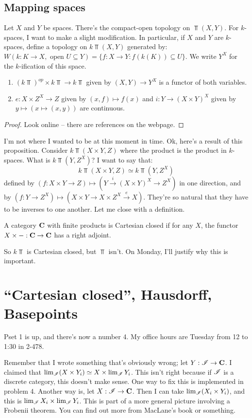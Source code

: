 \subsection{Mapping spaces}
Let $X$ and $Y$ be spaces. There's the compact-open topology on $\Top(X,Y)$. For $k$-spaces, I want to make a slight modification. In particular, if $X$ and $Y$ are $k$-spaces, define a topology on $k\Top(X,Y)$ generated by: $W(k:K\to X, \text{ open }U\subseteq Y)=\{f:X\to Y: f(k(K))\subseteq U\}$. We write $Y^X$ for the $k$-ification of this space.
\begin{prop}
    \begin{enumerate}
	\item $(k\Top)^{op}\times k\Top\to k\Top$ given by $(X,Y)\to Y^X$ is a functor of both variables.
	\item $e:X\times Z^X\to Z$ given by $(x,f)\mapsto f(x)$ and $i:Y\to (X\times Y)^X$ given by $y\mapsto(x\mapsto(x,y))$ are continuous.
    \end{enumerate}
\end{prop}
\begin{proof}
    Look online -- there are references on the webpage.
\end{proof}
I'm not where I wanted to be at this moment in time. Ok, here's a result of this proposition. Consider $k\Top(X\times Y,Z)$ where the product is the product in $k$-spaces. What is $k\Top(Y,Z^X)$? I want to say that:
$$k\Top(X\times Y,Z)\simeq k\Top(Y,Z^X)$$
defined by $(f:X\times Y\to Z)\mapsto (Y\xrightarrow{i}(X\times Y)^X\to Z^X)$ in one direction, and by $(f:Y\to Z^X)\mapsto(X\times Y\to X\times Z^X\xrightarrow{e} X)$. They're so natural that they have to be inverses to one another. Let me close with a definition.
\begin{definition}
    A category $\mathbf C$ with finite products is Cartesian closed if for any $X$, the functor $X\times -:\mathbf C\to \mathbf C$ has a right adjoint.
\end{definition}
So $k\Top$ is Cartesian closed, but $\Top$ isn't. On Monday, I'll justify why this is important.
\section{``Cartesian closed'', Hausdorff, Basepoints}
Pset 1 is up, and there's now a number 4. My office hours are Tuesday from 12 to 1:30 in 2-478.

Remember that I wrote something that's obviously wrong; let $Y:\mathscr I\to\mathbf C$. I claimed that $\lim_\mathscr I (X\times Y_i)\simeq X\times \lim_\mathscr I Y_i$. This isn't right because if $\mathscr I$ is a discrete category, this doesn't make sense. One way to fix this is implemented in problem 4. Another way is, let $X:\mathscr I\to\mathbf C$. Then I can take $\lim_\mathscr I(X_i\times Y_i)$, and this is $\lim_\mathscr I X_i\times \lim_\mathscr I Y_i$. This is part of a more general picture involving a Frobenii theorem. You can find out more from MacLane's book or something.

